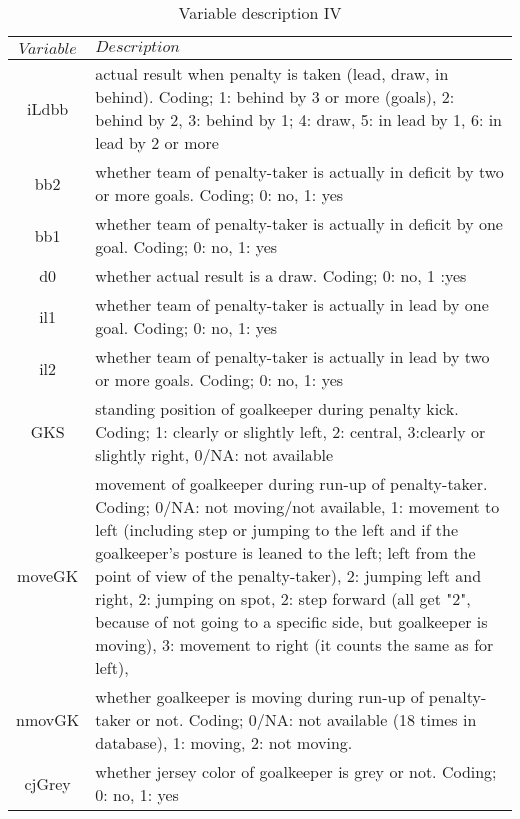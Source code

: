 \documentclass[12pt,dvipsnames]{article}%
\begin{document}
 \begin{table}[h]
\caption{Variable description \small{IV}}
\centering
\begin{tabular}{ c | p{12cm}  }
    $Variable$ & $Description$   \\
   \hline 
   
iLdbb & actual result when penalty is taken (lead, draw, in behind). Coding; 1: behind by 3 or more (goals), 2: behind by 2, 3: behind by 1; 4: draw, 5: in lead by 1, 6: in lead by 2 or more \\

bb2 & whether team of penalty-taker is actually in deficit by two or more goals. Coding; 0: no, 1: yes \\

bb1 & whether team of penalty-taker is actually in deficit by one goal. Coding; 0: no, 1: yes \\

d0 & whether actual result is a draw. Coding; 0: no, 1 :yes \\

il1 & whether team of penalty-taker is actually in lead by one goal. Coding; 0: no, 1: yes \\

il2 & whether team of penalty-taker is actually in lead by two or more goals. Coding; 0: no, 1: yes \\

GKS & standing position of goalkeeper during penalty kick. Coding; 1: clearly or slightly left, 2: central, 3:clearly or slightly right, 0/NA: not available \\

moveGK & movement of goalkeeper during run-up of penalty-taker. Coding; 0/NA: not moving/not available, 1: movement to left (including step or jumping to the left and if the goalkeeper's posture is leaned to the left; left from the point of view of the penalty-taker), 2: jumping left and right, 2: jumping on spot, 2: step forward (all get "2", because of not going to a specific side, but goalkeeper is moving), 3: movement to right (it counts the same as for left),  \\   

nmovGK & whether goalkeeper is moving during run-up of penalty-taker or not. Coding; 0/NA: not available (18 times in database), 1: moving,  2: not moving. \\

cjGrey & whether jersey color of goalkeeper is grey or not. Coding; 0: no, 1: yes \\


\end{tabular}
\end{table}
\end{document}
